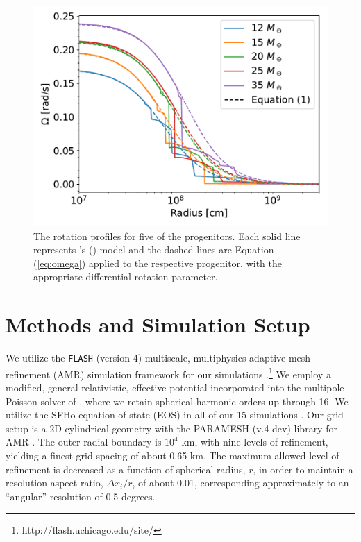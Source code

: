 \documentclass[twocolumn,times]{aastex62}  %
\begin{document}

\begin{figure}[t]
    \centering
    \includegraphics[scale=0.45]{figures/omega_vs_r.pdf}
    \caption{The rotation profiles for five of the \citet{heger:2005} progenitors.  Each solid line represents \citeauthor{heger:2005}'s (\citeyear{heger:2005}) model and the dashed lines are Equation (\ref{eq:omega}) applied to the respective progenitor, with the appropriate differential rotation parameter.  }
    \label{fig:ovsr}
\end{figure}

\section{Methods and Simulation Setup}
\label{sec:method}
We utilize the \texttt{FLASH} (version 4) multiscale, multiphysics adaptive mesh refinement (AMR) simulation framework for our simulations \citep{fryxell:2000,dubey:2009}.\footnote{http://flash.uchicago.edu/site/}  We employ a modified, general relativistic, effective potential \citep{marek:2006, oconnor:2018} incorporated into the multipole Poisson solver of \citet{couch:2013a}, where we retain spherical harmonic orders up through 16.   We utilize the SFHo equation of state (EOS) in all of our 15 simulations \citep{steiner:2013}.  Our grid setup is a 2D cylindrical geometry with the PARAMESH (v.4-dev) library for AMR  \citep{macneice:2000}.  The outer radial boundary is $10^4$ km, with nine levels of refinement, yielding a finest grid spacing of about 0.65 km.
The maximum allowed level of refinement is decreased as a function of spherical radius, $r$, in order to maintain a resolution aspect ratio, $\Delta x_i / r$, of about 0.01, corresponding approximately to an ``angular'' resolution of 0.5 degrees.
\end{document}
